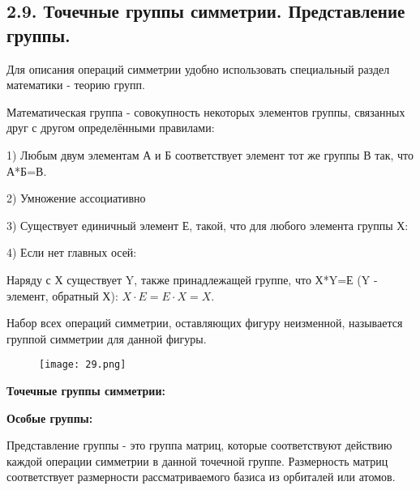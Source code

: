 
\subsection{2.9. Точечные группы симметрии. Представление группы.} 

\par\bigskip

Для описания операций симметрии удобно использовать
специальный раздел математики - теорию групп.

\par\smallskip

Математическая группа - совокупность некоторых элементов
группы, связанных друг с другом определёнными правилами:

\par\smallskip

1) Любым двум элементам А и Б соответствует элемент тот же
группы В так, что А*Б=В.

\par\smallskip

2) Умножение ассоциативно

\par\smallskip

3) Существует единичный элемент Е, такой, что для любого
элемента группы Х:
 
 \par\smallskip
 
4) Если нет главных осей:

 \par\smallskip
 
Наряду с Х существует Y, также принадлежащей группе, что
Х*Y=Е (Y - элемент, обратный Х): $X\cdot E = E\cdot X = X$.

  \par\smallskip
  
Набор всех операций симметрии, оставляющих фигуру
неизменной, называется группой симметрии для данной фигуры.

\begin{figure}[H]
	\centering
	{\texttt{[image: 29.png]}}
\end{figure}


\begin{center}
	\textbf{Точечные группы симметрии:}
\end{center}

\begin{center}
	\textbf{Особые группы:}
\end{center}

	Представление группы - это группа матриц, которые соответствуют
	действию каждой операции симметрии в данной точечной группе.
	Размерность матриц соответствует размерности рассматриваемого
	базиса из орбиталей или атомов.
	
